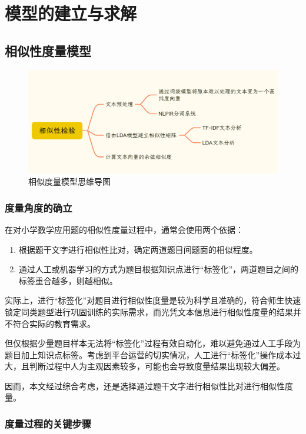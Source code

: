 \section{模型的建立与求解}

\subsection{相似性度量模型}

\begin{figure}[h]
    \centering
    \includegraphics[scale=0.2]{res/figure040956.png}
    \caption{相似度量模型思维导图}
\end{figure}

\subsubsection{度量角度的确立}

在对小学数学应用题的相似性度量过程中，通常会使用两个依据：

\begin{enumerate}
    \item 根据题干文字进行相似性比对，确定两道题目间题面的相似程度。
    \item 通过人工或机器学习的方式为题目根据知识点进行“标签化”，两道题目之间的标签重合越多，则越相似。
\end{enumerate}

实际上，进行“标签化”对题目进行相似性度量是较为科学且准确的，符合师生快速锁定同类题型进行巩固训练的实际需求，而光凭文本信息进行相似性度量的结果并不符合实际的教育需求。

但仅根据少量题目样本无法将“标签化”过程有效自动化，难以避免通过人工手段为题目加上知识点标签。考虑到平台运营的切实情况，人工进行“标签化”操作成本过大，且判断过程中人为主观因素较多，可能也会导致度量结果出现较大偏差。

因而，本文经过综合考虑，还是选择通过题干文字进行相似性比对进行相似性度量。

\subsubsection{度量过程的关键步骤}


